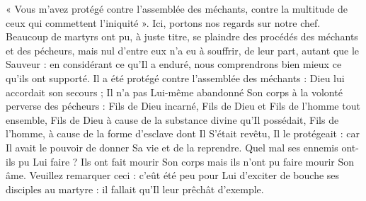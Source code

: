 « Vous m’avez protégé contre l’assemblée des méchants, contre la multitude de ceux qui commettent l’iniquité ». Ici, portons nos regards sur notre chef. Beaucoup de martyrs ont pu, à juste titre, se plaindre des procédés des méchants et des pécheurs, mais nul d’entre eux n’a eu à souffrir, de leur part, autant que le Sauveur : en considérant ce qu’Il a enduré, nous comprendrons bien mieux ce qu’ils ont supporté. Il a été protégé contre l’assemblée des méchants : Dieu lui accordait son secours ; Il n’a pas Lui-même abandonné Son corps à la volonté perverse des pécheurs : Fils de Dieu incarné, Fils de Dieu et Fils de l’homme tout ensemble, Fils de Dieu à cause de la substance divine qu’Il possédait, Fils de l’homme, à cause de la forme d’esclave dont Il S’était revêtu, Il le protégeait : car Il avait le pouvoir de donner Sa vie et de la reprendre. Quel mal ses ennemis ont-ils pu Lui faire ? Ils ont fait mourir Son corps mais ils n’ont pu faire mourir Son âme. Veuillez remarquer ceci : c’eût été peu pour Lui d’exciter de bouche ses disciples au martyre : il fallait qu’Il leur prêchât d’exemple.